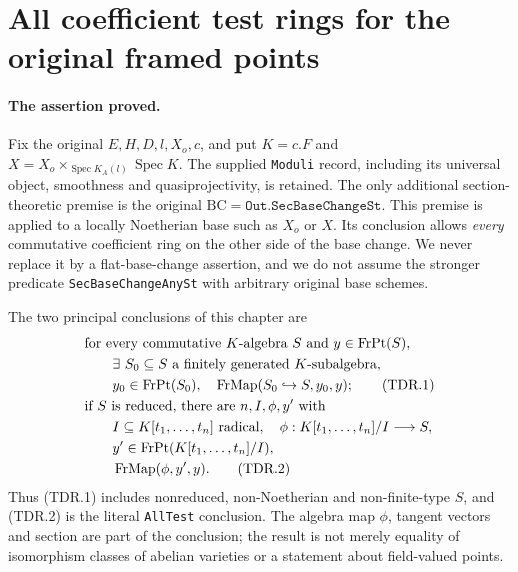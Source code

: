 \section{All coefficient test rings for the original framed points}

\paragraph{The assertion proved.}
Fix the original \(E,H,D,l,X_o,c\), and put \(K=c.F\) and
\(X=X_o\times_{\operatorname{Spec}K_A(l)}\operatorname{Spec}K\).
The supplied \texttt{Moduli} record, including its universal object,
smoothness and quasiprojectivity, is retained.  The only additional
section-theoretic premise is the original
\(\mathrm{BC}=\texttt{Out.SecBaseChangeSt}\).  This premise is applied
to a locally Noetherian base such as \(X_o\) or \(X\).  Its conclusion
allows \emph{every} commutative coefficient ring on the other side of
the base change.  We never replace it by a flat-base-change assertion,
and we do not assume the stronger predicate
\texttt{SecBaseChangeAnySt} with arbitrary original base schemes.

The two principal conclusions of this chapter are
\begin{align}
 &\text{for every commutative }K\text{-algebra }S
   \text{ and }y\in\operatorname{FrPt}(S),\notag\\
 &\qquad\exists\ S_0\subseteq S\text{ a finitely generated }K
       \text{-subalgebra},\notag\\
 &\qquad y_0\in\operatorname{FrPt}(S_0),\quad
       \operatorname{FrMap}(S_0\hookrightarrow S,y_0,y);       \tag{TDR.1}\\
 &\text{if }S\text{ is reduced, there are }n,I,\phi,y'\text{ with}\notag\\
 &\qquad I\subseteq K[t_1,\ldots,t_n]\text{ radical},\quad
       \phi:K[t_1,\ldots,t_n]/I\longrightarrow S,\notag\\
 &\qquad y'\in\operatorname{FrPt}(K[t_1,\ldots,t_n]/I),\notag\\
 &\qquad
       \operatorname{FrMap}(\phi,y',y).                       \tag{TDR.2}
\end{align}
Thus (TDR.1) includes nonreduced, non-Noetherian and non-finite-type
\(S\), and (TDR.2) is the literal \texttt{AllTest} conclusion.
The algebra map \(\phi\), tangent vectors and section are part of the
conclusion; the result is not merely equality of isomorphism classes
of abelian varieties or a statement about field-valued points.

